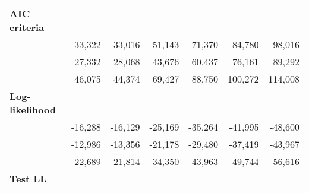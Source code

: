 \begin{tabular}{lllllll}
\multicolumn{1}{l}{\textbf{AIC criteria}} &
  \multicolumn{1}{|r}{} &
  \multicolumn{1}{r}{} &
  \multicolumn{1}{r}{} &
  \multicolumn{1}{r}{} &
  \multicolumn{1}{r}{} &
  \multicolumn{1}{r}{} \\
\multicolumn{1}{l}{\hspace{1em}{Model (A)}} &
  \multicolumn{1}{|r}{33,322} &
  \multicolumn{1}{r}{33,016} &
  \multicolumn{1}{r}{51,143} &
  \multicolumn{1}{r}{71,370} &
  \multicolumn{1}{r}{84,780} &
  \multicolumn{1}{r}{98,016} \\
\multicolumn{1}{l}{\hspace{1em}{Model (B)}} &
  \multicolumn{1}{|r}{27,332} &
  \multicolumn{1}{r}{28,068} &
  \multicolumn{1}{r}{43,676} &
  \multicolumn{1}{r}{60,437} &
  \multicolumn{1}{r}{76,161} &
  \multicolumn{1}{r}{89,292} \\
\multicolumn{1}{l}{\hspace{1em}{Model (C)}} &
  \multicolumn{1}{|r}{46,075} &
  \multicolumn{1}{r}{44,374} &
  \multicolumn{1}{r}{69,427} &
  \multicolumn{1}{r}{88,750} &
  \multicolumn{1}{r}{100,272} &
  \multicolumn{1}{r}{114,008} \\
\multicolumn{1}{l}{\textbf{Log-likelihood}} &
  \multicolumn{1}{|r}{} &
  \multicolumn{1}{r}{} &
  \multicolumn{1}{r}{} &
  \multicolumn{1}{r}{} &
  \multicolumn{1}{r}{} &
  \multicolumn{1}{r}{} \\
\multicolumn{1}{l}{\hspace{1em}{Model (A)}} &
  \multicolumn{1}{|r}{-16,288} &
  \multicolumn{1}{r}{-16,129} &
  \multicolumn{1}{r}{-25,169} &
  \multicolumn{1}{r}{-35,264} &
  \multicolumn{1}{r}{-41,995} &
  \multicolumn{1}{r}{-48,600} \\
\multicolumn{1}{l}{\hspace{1em}{Model (B)}} &
  \multicolumn{1}{|r}{-12,986} &
  \multicolumn{1}{r}{-13,356} &
  \multicolumn{1}{r}{-21,178} &
  \multicolumn{1}{r}{-29,480} &
  \multicolumn{1}{r}{-37,419} &
  \multicolumn{1}{r}{-43,967} \\
\multicolumn{1}{l}{\hspace{1em}{Model (C)}} &
  \multicolumn{1}{|r}{-22,689} &
  \multicolumn{1}{r}{-21,814} &
  \multicolumn{1}{r}{-34,350} &
  \multicolumn{1}{r}{-43,963} &
  \multicolumn{1}{r}{-49,744} &
  \multicolumn{1}{r}{-56,616} \\
\multicolumn{1}{l}{\textbf{Test LL}} &
  \multicolumn{1}{|r}{} &
  \multicolumn{1}{r}{} &
  \multicolumn{1}{r}{} &
  \multicolumn{1}{r}{} &
  \multicolumn{1}{r}{} &
  \multicolumn{1}{r}{} \\

\end{tabular}
